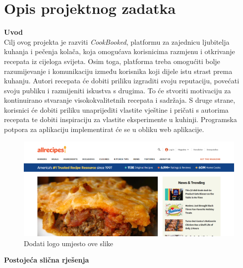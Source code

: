 \chapter{Opis projektnog zadatka}
		
		\noindent\textbf{Uvod}\\
		
		\noindent Cilj ovog projekta je razviti \textit{CookBooked}, platformu za zajednicu ljubitelja kuhanja i pečenja kolača, koja omogućava korisnicima razmjenu i otkrivanje recepata iz cijeloga svijeta. Osim toga, platforma treba omogućiti bolje razumijevanje i komunikaciju između korisnika koji dijele istu strast prema kuhanju. Autori recepata će dobiti priliku izgraditi svoju reputaciju, povećati svoju publiku i razmijeniti iskustva s drugima. To će stvoriti motivaciju za kontinuirano stvaranje visokokvalitetnih recepata i sadržaja. S druge strane, korisnici će dobiti priliku unaprijediti vlastite vještine i pričati s autorima recepata te dobiti inspiraciju za vlastite eksperimente u kuhinji. Programska potpora za aplikaciju implementirat će se u obliku web aplikacije.\\
		\begin{figure}[H]
			\includegraphics[width=\textwidth]{slike/allrecipes.png} %
			\caption{Dodati logo umjesto ove slike}
			\label{fig:logo} %
		\end{figure}
		\eject

		\noindent\textbf{Postojeća slična rješenja}\\

